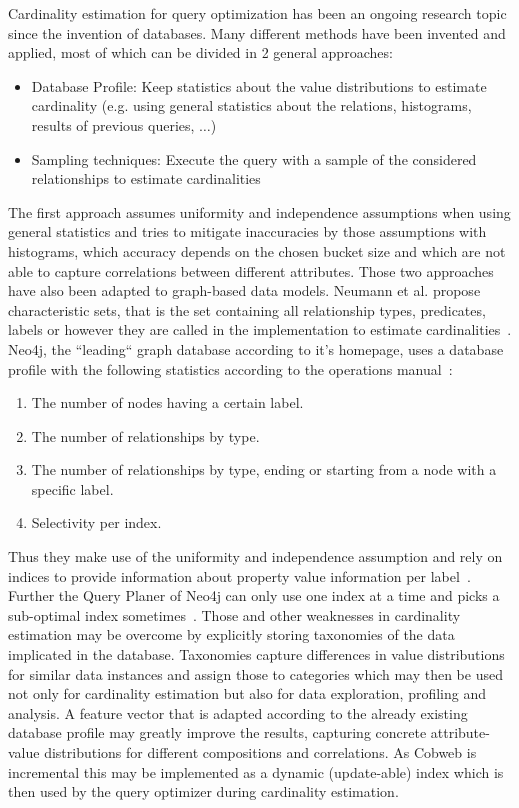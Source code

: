 Cardinality estimation for query optimization has been an ongoing research topic since the invention of databases. Many different methods have been invented and applied, most of which can be divided in 2 general approaches:
\begin{itemize}
    \item Database Profile: Keep statistics about the value distributions to estimate cardinality (e.g. using general statistics about the relations, histograms, results of previous queries, $\dots$)
    \item  Sampling techniques: Execute the query with a sample of the considered relationships to
estimate cardinalities
\end{itemize}
The first approach assumes uniformity and independence assumptions when using general statistics and tries to mitigate inaccuracies by those assumptions with histograms, which accuracy depends on the chosen bucket size and which are not able to capture correlations between different attributes. Those two approaches have also been adapted to graph-based data models. 
Neumann et al. propose characteristic sets, that is the set containing all relationship types, predicates, labels or however they are called in the implementation to estimate cardinalities~\cite{neumann2011characteristic}. \\
Neo4j, the ``leading`` graph database according to it’s homepage, uses a database profile with the following statistics according to the operations manual~\cite{neo4jstatistics}:
\begin{enumerate}
    \item The number of nodes having a certain label.
    \item The number of relationships by type.
    \item  The number of relationships by type, ending or starting from a node with a specific label.
    \item Selectivity per index.
\end{enumerate}
Thus they make use of the uniformity and independence assumption and rely on indices to
provide information about property value information per label~\cite{neo4jIndex}. Further the Query Planer of Neo4j can only use one index at a time and picks a sub-optimal index sometimes~\cite{neo4jBadindex}.
Those and other weaknesses in cardinality estimation may be overcome by explicitly storing taxonomies of the data implicated in the database. Taxonomies capture differences in value distributions for similar data instances and assign those to categories which may then be used not only for cardinality estimation but also for data exploration, profiling and analysis. A feature vector that is adapted according to the already existing database profile may greatly improve the results, capturing concrete attribute-value distributions for different compositions and correlations. As Cobweb is incremental this may be implemented as a dynamic (update-able) index which is then used by the query optimizer during cardinality estimation. \\
